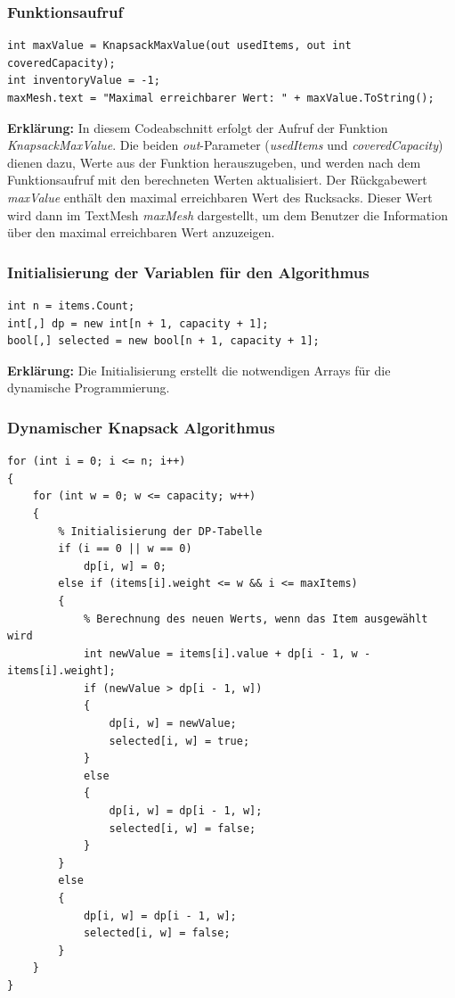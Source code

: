 \subsubsection{Funktionsaufruf}
\begin{lstlisting}[style=csharp, caption={}, label=code:init]
int maxValue = KnapsackMaxValue(out usedItems, out int coveredCapacity);
int inventoryValue = -1;
maxMesh.text = "Maximal erreichbarer Wert: " + maxValue.ToString();
\end{lstlisting}
\textbf{Erklärung:} In diesem Codeabschnitt erfolgt der Aufruf der Funktion \textit{KnapsackMaxValue}. Die beiden
\textit{out}-Parameter (\textit{usedItems} und \textit{coveredCapacity}) dienen dazu, Werte aus der Funktion
herauszugeben, und werden nach dem Funktionsaufruf mit den berechneten Werten aktualisiert. Der Rückgabewert
\textit{maxValue} enthält den maximal erreichbaren Wert des Rucksacks. Dieser Wert wird dann im TextMesh \textit{maxMesh}
dargestellt, um dem Benutzer die Information über den maximal erreichbaren Wert anzuzeigen.

\subsubsection{Initialisierung der Variablen für den Algorithmus}
\begin{lstlisting}[style=csharp, caption={}, label=code:variable]
int n = items.Count;
int[,] dp = new int[n + 1, capacity + 1];
bool[,] selected = new bool[n + 1, capacity + 1];
\end{lstlisting}
\textbf{Erklärung:} Die Initialisierung erstellt die notwendigen Arrays für die dynamische Programmierung.\\

\subsubsection{Dynamischer Knapsack Algorithmus}
\begin{lstlisting}[style=csharp, caption={}, label=code:dynamic]
for (int i = 0; i <= n; i++)
{
    for (int w = 0; w <= capacity; w++)
    {
        % Initialisierung der DP-Tabelle
        if (i == 0 || w == 0)
            dp[i, w] = 0;
        else if (items[i].weight <= w && i <= maxItems)
        {
            % Berechnung des neuen Werts, wenn das Item ausgewählt wird
            int newValue = items[i].value + dp[i - 1, w - items[i].weight];
            if (newValue > dp[i - 1, w])
            {
                dp[i, w] = newValue;
                selected[i, w] = true;
            }
            else
            {
                dp[i, w] = dp[i - 1, w];
                selected[i, w] = false;
            }
        }
        else
        {
            dp[i, w] = dp[i - 1, w];
            selected[i, w] = false;
        }
    }
}
\end{lstlisting}

